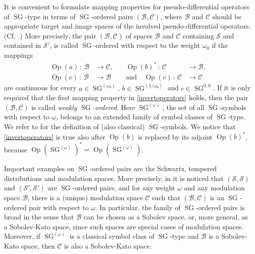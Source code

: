 \documentclass[12pt,a4paper,reqno]{amsart}
\numberwithin{equation}{section}
\numberwithin{thm}{section}
\theoremstyle{definition}
\theoremstyle{remark}
\begin{document}
\par

It is convenient to formulate mapping properties for pseudo-differential
operators of ${\operatorname{SG}}$-type in terms of ${\operatorname{SG}}$-ordered pairs $({{\mathcal B}} ,{{\mathcal C}})$,
where ${{\mathcal B}}$ and ${{\mathcal C}}$ should be appropriate target and image spaces
of the involved pseudo-differential operators. (Cf. \cite{CJT2}.) More
precisely, the pair $({{\mathcal B}} ,{{\mathcal C}} )$ of spaces ${{\mathcal B}}$ and ${{\mathcal C}}$ containing
${{\mathscr S}}$ and contained in ${{\mathscr S}} '$, is called ${\operatorname{SG}}$-ordered with respect to
the weight $\omega _0$ if the mappings
\begin{equation}\label{invertoperators}
\begin{alignedat}{2}
{\operatorname{Op}} (a)\, :\, {{\mathcal B}} &\to {{\mathcal C}} ,&\quad 
{\operatorname{Op}} (b)^*\, :\, {{\mathcal C}} &\to {{\mathcal B}} ,
\\[1ex]
{\operatorname{Op}} (c)\, :\, {{\mathcal B}} &\to {{\mathcal B}}  &\quad \text{and}\quad
{\operatorname{Op}} (c)\, :\, {{\mathcal C}} &\to {{\mathcal C}}
\end{alignedat}
\end{equation}
are continuous for every $a\in {\operatorname{SG}} ^{(\omega _0)}$, $b\in {\operatorname{SG}}
^{(1/\omega _0)}$ and $c\in {\operatorname{SG}} ^{0,0}$. If it is only required that the first
mapping property in \eqref{invertoperators} holds, then the pair $({{\mathcal B}} ,{{\mathcal C}} )$
is called \emph{weakly ${\operatorname{SG}}$-ordered}. Here ${\operatorname{SG}} ^{(\omega )}$,
the set of all ${\operatorname{SG}}$-symbols with respect to $\omega$, belongs to an
extended family of symbol classes of ${\operatorname{SG}}$-type. We refer to
\cite{CoMa} for the definition of (also classical) ${\operatorname{SG}}$-symbols.
We notice that \eqref{invertoperators} is true also after ${\operatorname{Op}} (b)$ is
replaced by its adjoint ${\operatorname{Op}} (b)^*$, because ${\operatorname{Op}} ({\operatorname{SG}} ^{(\omega )})^*
= {\operatorname{Op}} ({\operatorname{SG}} ^{(\omega )})$.

\par

Important examples on ${\operatorname{SG}}$-ordered pairs are the Schwartz,
tempered distributions and modulation spaces. More
precisely, in \cite{CJT2} it is noticed that $({\mathscr S} ,{\mathscr S} )$ and
$({\mathscr S} ',{\mathscr S} ')$ are ${\operatorname{SG}}$-ordered pairs, and for any weight
$\omega$ and any modulation space ${{\mathcal B}}$, there is a (unique)
modulation space ${{\mathcal C}}$ such
that $({{\mathcal B}} ,{{\mathcal C}} )$ is an ${\operatorname{SG}}$-ordered pair with respect to $\omega$. In
particular, the family of ${\operatorname{SG}}$-ordered pairs is broad in the sense that ${{\mathcal B}}$
can be chosen as a Sobolev space, or, more general, as a Sobolev-Kato
space, since such spaces are special cases of modulation spaces.
Moreover, if ${\operatorname{SG}} ^{(\omega )}$ is a classical symbol class of
${\operatorname{SG}}$-type and ${{\mathcal B}}$ is a Sobolev-Kato space, then ${{\mathcal C}}$ is also a
Sobolev-Kato space.
\end{document}
